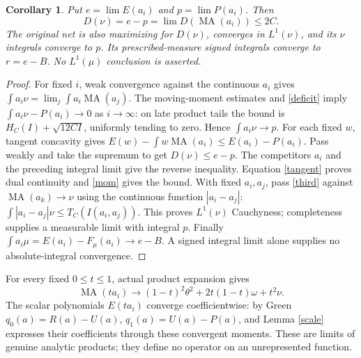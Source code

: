 \documentclass[11pt]{article}
\newtheorem{corollary}[theorem]{Corollary}
\newcommand{\MA}{\operatorname{MA}}
\begin{document}
\begin{corollary}\label{dualcontinuous}
Put $e=\lim E(a_i)$ and $p=\lim P(a_i)$. Then
\[
 D(\nu)=e-p=\lim D(\MA(a_i))\le2C.
\]
The original net is also maximizing for $D(\nu)$, converges in
$L^1(\nu)$, and its $\nu$ integrals converge to $p$.
Its prescribed-measure signed integrals converge to $r=e-B$.
No $L^1(\mu)$ conclusion is asserted.
\end{corollary}
\begin{proof}
For fixed $i$, weak convergence against the continuous $a_i$ gives
$\int a_i\nu=\lim_j\int a_i\MA(a_j)$.
The moving-moment estimates and \eqref{deficit} imply
$\int a_i\nu-P(a_i)\to0$ as $i\to\infty$:
on late product tails the bound is $H_C(I)+\sqrt{12CI}$,
uniformly tending to zero. Hence $\int a_i\nu\to p$.
For each fixed $w$, tangent concavity gives
$E(w)-\int w\MA(a_i)\le E(a_i)-P(a_i)$. Pass weakly and take
the supremum to get $D(\nu)\le e-p$. The competitors $a_i$ and
the preceding integral limit give the reverse inequality.
Equation \eqref{tangent} proves dual continuity and \eqref{mom}
gives the bound. With fixed $a_i,a_j$, pass \eqref{third} against
$\MA(a_k)\to\nu$ using the continuous function $|a_i-a_j|$:
$\int|a_i-a_j|\nu\le T_C(I(a_i,a_j))$. This proves $L^1(\nu)$
Cauchyness; completeness supplies a measurable limit with integral $p$.
Finally $\int a_i\mu=E(a_i)-F_\mu(a_i)\to e-B$.
A signed integral limit alone supplies no absolute-integral convergence.
\end{proof}

For every fixed $0\le t\le1$, actual product expansion gives
\[
 \MA(ta_i)\longrightarrow
 (1-t)^2\theta^2+2t(1-t)\omega+t^2\nu.
\]
The scalar polynomials $E(ta_i)$ converge coefficientwise: by Green
$q_0(a)=R(a)-U(a)$, $q_1(a)=U(a)-P(a)$, and
Lemma \ref{scale} expresses their coefficients through these convergent
moments. These are limits of genuine analytic products; they define no
operator on an unrepresented function.
\end{document}
